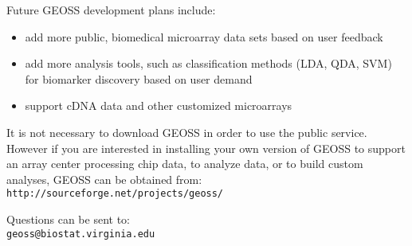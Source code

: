 \documentclass{compactslide} %
\begin{document}
\begin{slide}

Future GEOSS development plans include:
\begin{itemize}
\item add more public, biomedical microarray data sets based on user
feedback
\item add more analysis tools, such as classification methods (LDA, QDA,
SVM) for biomarker discovery based on user demand
\item support cDNA data and other customized microarrays
\end{itemize}
\end{slide}

\begin{slide}

It is not necessary to download GEOSS in order to use the public
service.  However if you are interested in installing your own version
of GEOSS to support an array center processing chip data, to analyze
data, or to build custom analyses, GEOSS can be obtained from: \\
\texttt{http://sourceforge.net/projects/geoss/}

Questions can be sent to: \\
  \texttt{geoss@biostat.virginia.edu}
\end{slide}
\end{document}
